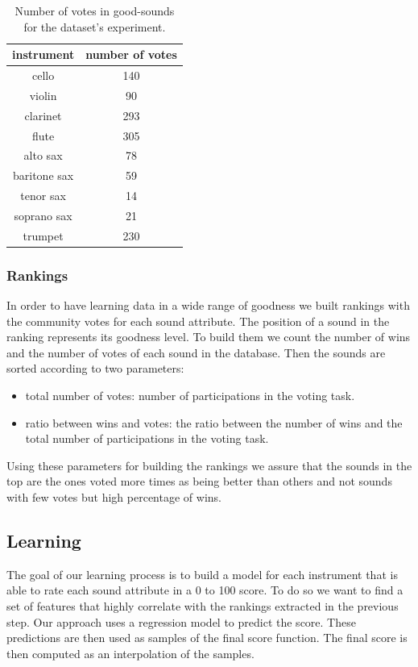 \documentclass{article}
\begin{document}
\begin{table}[ht]
\centering
\begin{tabular}{cc}
\hline
instrument   & number of votes \\ \hline
cello        & 140             \\
violin       & 90              \\
clarinet     & 293             \\
flute        & 305             \\
alto sax     & 78              \\
baritone sax & 59              \\
tenor sax    & 14              \\
soprano sax  & 21              \\
trumpet      & 230             \\ \hline
\end{tabular}
\caption{Number of votes in good-sounds for the dataset's experiment.}
\label{votes}
\end{table}

\subsubsection{Rankings}
In order to have learning data in a wide range of goodness we built rankings with the community votes for each sound attribute. The position of a sound in the ranking represents its goodness level. To build them we count the number of wins and the number of votes of each sound in the database. Then the sounds are sorted according to two parameters: 

\begin{itemize}
	\item{total number of votes: number of participations in the voting task.}
	\item{ratio between wins and votes: the ratio between the number of wins and the total number of participations in the voting task.}
\end{itemize}
  
Using these parameters for building the rankings we assure that the sounds in the top are the ones voted more times as being better than others and not sounds with few votes but high percentage of wins.

\subsection{Learning}
The goal of our learning process is to build a model for each instrument that is able to rate each sound attribute in a 0 to 100 score. To do so we want to find a set of features that highly correlate with the rankings extracted in the previous step.  
Our approach uses a regression model to predict the score. These predictions are then used as samples of the final score function. The final score is then computed as an interpolation of the samples.
\end{document}
